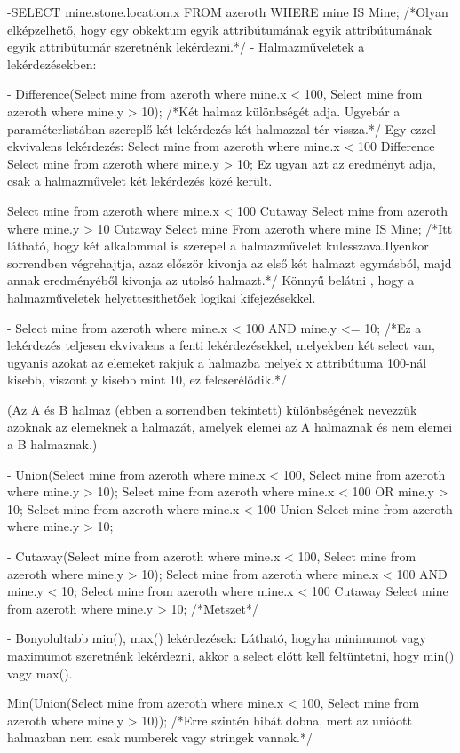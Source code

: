 -SELECT mine.stone.location.x FROM azeroth WHERE mine IS Mine; /*Olyan elképzelhető, hogy egy obkektum egyik attribútumának egyik attribútumának egyik attribútumár szeretnénk lekérdezni.*/
- Halmazműveletek a lekérdezésekben:

- Difference(Select mine from azeroth where mine.x < 100, Select mine from azeroth where mine.y > 10);  /*Két halmaz különbségét adja. Ugyebár a paraméterlistában szereplő két lekérdezés két halmazzal tér vissza.*/
Egy ezzel ekvivalens lekérdezés:
Select mine from azeroth where mine.x < 100 Difference Select mine from azeroth where mine.y > 10;   Ez ugyan azt az eredményt adja, csak a halmazművelet két lekérdezés közé került.

Select mine from azeroth where mine.x < 100 Cutaway Select mine from azeroth where mine.y > 10 Cutaway Select mine From azeroth where mine IS Mine;
/*Itt látható, hogy két alkalommal is szerepel a halmazművelet kulcsszava.Ilyenkor sorrendben végrehajtja, azaz először kivonja az első két halmazt egymásból, majd annak eredményéből kivonja az utolsó halmazt.*/
Könnyű belátni , hogy a halmazműveletek helyettesíthetőek logikai kifejezésekkel.

- Select mine from azeroth where mine.x < 100 AND mine.y <= 10;  /*Ez a lekérdezés teljesen ekvivalens a fenti lekérdezésekkel, melyekben két select van, ugyanis azokat az elemeket rakjuk a halmazba melyek x attribútuma 100-nál kisebb, viszont y kisebb mint 10, ez felcserélődik.*/

(Az A és B halmaz (ebben a sorrendben tekintett) különbségének nevezzük azoknak az elemeknek a halmazát, amelyek elemei az A halmaznak és nem elemei a B halmaznak.)

- Union(Select mine from azeroth where mine.x < 100, Select mine from azeroth where mine.y > 10);
Select mine from azeroth where mine.x < 100 OR mine.y > 10;
Select mine from azeroth where mine.x < 100 Union Select mine from azeroth where mine.y > 10;

- Cutaway(Select mine from azeroth where mine.x < 100, Select mine from azeroth where mine.y > 10);
Select mine from azeroth where mine.x < 100 AND mine.y < 10;
Select mine from azeroth where mine.x < 100 Cutaway Select mine from azeroth where mine.y > 10;
/*Metszet*/

- Bonyolultabb min(), max() lekérdezések: Látható, hogyha minimumot vagy maximumot szeretnénk lekérdezni, akkor a select előtt kell feltüntetni, hogy min() vagy max().

Min(Union(Select mine from azeroth where mine.x < 100, Select mine from azeroth where mine.y > 10)); /*Erre szintén hibát dobna, mert az unióott halmazban nem csak numberek vagy stringek vannak.*/

